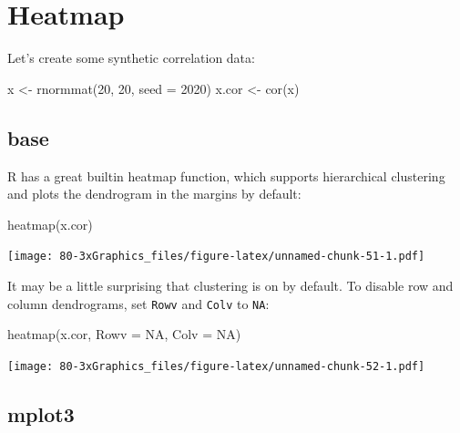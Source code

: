 \documentclass[
]{book}
\newenvironment{Shaded}{\begin{snugshade}}{\end{snugshade}}
\newcommand{\AttributeTok}[1]{\textcolor[rgb]{0.77,0.63,0.00}{#1}}
\newcommand{\ConstantTok}[1]{\textcolor[rgb]{0.00,0.00,0.00}{#1}}
\newcommand{\DecValTok}[1]{\textcolor[rgb]{0.00,0.00,0.81}{#1}}
\newcommand{\FunctionTok}[1]{\textcolor[rgb]{0.00,0.00,0.00}{#1}}
\newcommand{\NormalTok}[1]{#1}
\newcommand{\OtherTok}[1]{\textcolor[rgb]{0.56,0.35,0.01}{#1}}
\begin{document}
\hypertarget{heatmap-1}{%
\section{Heatmap}\label{heatmap-1}}

Let's create some synthetic correlation data:

\begin{Shaded}
\begin{Highlighting}[]
\NormalTok{x }\OtherTok{\textless{}{-}} \FunctionTok{rnormmat}\NormalTok{(}\DecValTok{20}\NormalTok{, }\DecValTok{20}\NormalTok{, }\AttributeTok{seed =} \DecValTok{2020}\NormalTok{)}
\NormalTok{x.cor }\OtherTok{\textless{}{-}} \FunctionTok{cor}\NormalTok{(x)}
\end{Highlighting}
\end{Shaded}

\hypertarget{base-7}{%
\subsection{base}\label{base-7}}

R has a great builtin heatmap function, which supports hierarchical clustering and plots the dendrogram in the margins by default:

\begin{Shaded}
\begin{Highlighting}[]
\FunctionTok{heatmap}\NormalTok{(x.cor)}
\end{Highlighting}
\end{Shaded}

\texttt{[image: 80-3xGraphics\_files/figure-latex/unnamed-chunk-51-1.pdf]}

It may be a little surprising that clustering is on by default. To disable row and column dendrograms, set \texttt{Rowv} and \texttt{Colv} to \texttt{NA}:

\begin{Shaded}
\begin{Highlighting}[]
\FunctionTok{heatmap}\NormalTok{(x.cor, }\AttributeTok{Rowv =} \ConstantTok{NA}\NormalTok{, }\AttributeTok{Colv =} \ConstantTok{NA}\NormalTok{)}
\end{Highlighting}
\end{Shaded}

\texttt{[image: 80-3xGraphics\_files/figure-latex/unnamed-chunk-52-1.pdf]}

\hypertarget{mplot3-6}{%
\subsection{\texorpdfstring{\textbf{mplot3}}{mplot3}}\label{mplot3-6}}
\end{document}
